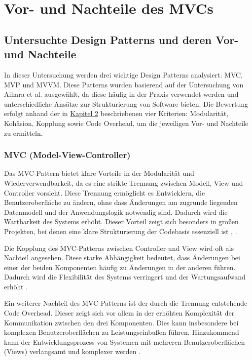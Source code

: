 \chapter{Vor- und Nachteile des MVCs}


\section{Untersuchte Design Patterns und deren Vor- und Nachteile}

In dieser Untersuchung werden drei wichtige Design Patterns analysiert: \ac{MVC}, \ac{MVP} und \ac{MVVM}. Diese Patterns wurden basierend auf der Untersuchung von Aihara et al. \cite{aihara2012mvc} ausgewählt, da diese häufig in der Praxis verwendet werden und unterschiedliche Ansätze zur Strukturierung von Software bieten. Die Bewertung erfolgt anhand der in \hyperref[chap:methodik]{Kapitel 2} beschriebenen vier Kriterien: Modularität, Kohäsion, Kopplung sowie Code Overhead, um die jeweiligen Vor- und Nachteile zu ermitteln.

\subsection{MVC (Model-View-Controller)}

Das \ac{MVC}-Pattern bietet klare Vorteile in der Modularität und 
Wiederverwendbarkeit, da es eine strikte Trennung zwischen 
Modell, View und Controller vorsieht. Diese Trennung ermöglicht 
es Entwicklern, die Benutzeroberfläche zu ändern, ohne dass 
Änderungen am zugrunde liegenden Datenmodell und der Anwendungslogik notwendig sind. Dadurch wird die Wartbarkeit des Systems erhöht. Dieser Vorteil zeigt sich besonders in großen Projekten, bei denen eine klare Strukturierung der Codebasis essenziell ist \cite{eudl63}, 
\cite{researchgate65}.

Die Kopplung des \ac{MVC}-Patterns zwischen Controller und View wird oft als Nachteil angesehen. Diese starke Abhängigkeit bedeutet, dass Änderungen bei einer der beiden Komponenten häufig zu Änderungen in der anderen führen. Dadurch wird die Flexibilität des Systems verringert und der Wartungsaufwand erhöht \cite{researchgate65}.

Ein weiterer Nachteil des \ac{MVC}-Patterns ist der durch die Trennung entstehende Code Overhead. Dieser zeigt sich vor allem in der erhöhten Komplexität der Kommunikation zwischen den drei 
Komponenten. Dies kann insbesondere bei komplexen Benutzeroberflächen zu Leistungseinbußen führen. Hinzukommend kann der Entwicklungsprozess von Systemen mit mehreren Benutzeroberflächen (Views) verlangsamt und komplexer werden \cite{eudl63}.

